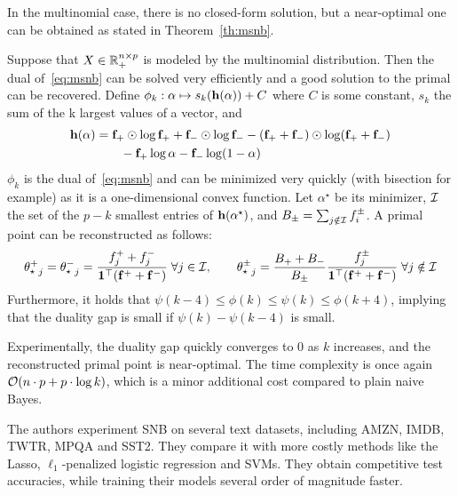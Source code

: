 In the multinomial case, there is no closed-form solution, but a near-optimal one can be obtained as
stated in Theorem~\ref{th:msnb}.
\begin{theorem}\label{th:msnb}
    Suppose that $X \in \mathbb{R}_+^{n \times p}$ is modeled by the multinomial distribution.
    Then the dual of~\ref{eq:msnb} can be solved very efficiently and a good solution to the primal can be recovered.
    Define $\phi_k : \alpha \mapsto s_k(\mathbf{h}(\alpha)) + C$ where $C$ is some constant,
    $s_k$ the sum of the k largest values of a vector, and
    \begin{equation*}
        \begin{split}
            \mathbf{h}(\alpha) &= \mathbf{f}_+ \odot \log \mathbf{f}_+ + \mathbf{f}_- \odot \log \mathbf{f}_-
                    - (\mathbf{f}_+ + \mathbf{f}_-) \odot \log (\mathbf{f}_+ + \mathbf{f}_-)\\
                &\qquad - \mathbf{f}_+ \log \alpha - \mathbf{f}_- \log (1 - \alpha)
        \end{split}
    \end{equation*}
    $\phi_k$ is the dual of~\ref{eq:msnb} and can be minimized very quickly (with bisection for example)
    as it is a one-dimensional convex function.
    Let $\alpha^\star$ be its minimizer, $\mathcal{I}$ the set of the $p - k$ smallest entries of
    $\mathbf{h}(\alpha^\star)$, and $B_\pm = \sum_{j \notin \mathcal{I}} f_i^\pm$.
    A primal point can be reconstructed as follows:
    \begin{equation*}
        {\theta^+_\star}_j = {\theta^-_\star}_j = \frac{f_j^+ + f_j^-}{\mathbf{1}^\top(\mathbf{f}^+ + \mathbf{f}^-)}
        \;\forall j \in \mathcal{I}
        ,\qquad
        {\theta^\pm_\star}_j = \frac{B_+ + B_-}{B_\pm}\frac{f^\pm_j}{\mathbf{1}^\top(\mathbf{f}^+ + \mathbf{f}^-)}
        \;\forall j \notin \mathcal{I}
    \end{equation*}
    Furthermore, it holds that $\psi(k - 4) \leq \phi(k) \leq \psi(k) \leq \phi(k + 4)$,
    implying that the duality gap is small if $\psi(k) - \psi(k - 4)$ is small.
\end{theorem}
Experimentally, the duality gap quickly converges to $0$ as $k$ increases,
and the reconstructed primal point is near-optimal.
The time complexity is once again $\mathcal{O}(n \cdot p + p \cdot \log k)$,
which is a minor additional cost compared to plain naive Bayes.

The authors experiment SNB on several text datasets,
including AMZN, IMDB, TWTR, MPQA and SST2.
They compare it with more costly methods like the Lasso, $\ell_1$-penalized logistic regression and SVMs.
They obtain competitive test accuracies, while training their models several order of magnitude faster.

